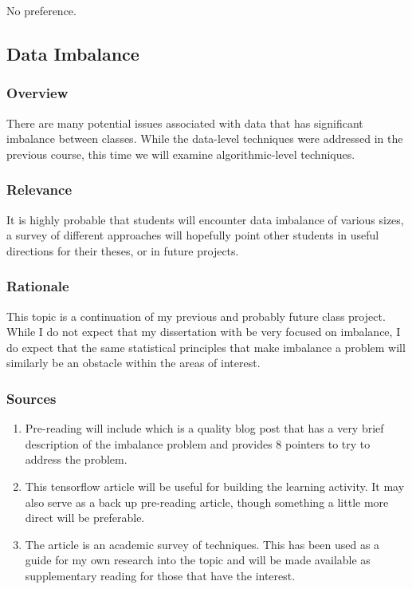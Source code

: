 \documentclass[12pt]{amsart}
\begin{document}
No preference. \\

\subsection{Data Imbalance}

\subsubsection{Overview}
There are many potential issues associated with data that has significant imbalance between classes. 
While the data-level techniques were addressed in the previous course, 
this time we will examine algorithmic-level techniques.

\subsubsection{Relevance}
It is highly probable that students will encounter data imbalance of various sizes,
a survey of different approaches will hopefully point other students in useful directions
for their theses, or in future projects.

\subsubsection{Rationale}
This topic is a continuation of my previous and probably future class project.
While I do not expect that my dissertation with be very focused on imbalance, 
I do expect that the same statistical principles that make imbalance a problem
will similarly be an obstacle within the areas of interest.

\subsubsection{Sources}
\begin{enumerate}
	\item Pre-reading will include\cite{} which is a quality blog post that has a very brief 
	description of the imbalance problem and provides 8 pointers to try to address the problem.
	\item This \cite{} tensorflow article will be useful for building the learning
	activity. It may also serve as a back up pre-reading article, though something a little 
	more direct will be preferable.
	\item The \cite{} article is an academic survey of techniques. 
	This has been used as a guide for my own research into the topic and will be made available
	as supplementary reading for those that have the interest.
\end{enumerate}
\end{document}
